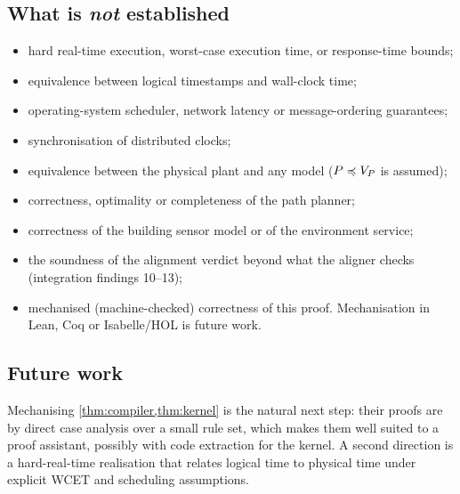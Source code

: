 \subsection{What is \emph{not} established}
\begin{itemize}
\item hard real-time execution, worst-case execution time, or response-time bounds;
\item equivalence between logical timestamps and wall-clock time;
\item operating-system scheduler, network latency or message-ordering guarantees;
\item synchronisation of distributed clocks;
\item equivalence between the physical plant and any model ($P\preccurlyeq V_P$ is assumed);
\item correctness, optimality or completeness of the path planner;
\item correctness of the building sensor model or of the environment service;
\item the soundness of the alignment verdict beyond what the aligner checks
  (integration findings 10--13);
\item mechanised (machine-checked) correctness of this proof. Mechanisation in
  Lean, Coq or Isabelle/HOL is future work.
\end{itemize}

\subsection{Future work}
Mechanising \cref{thm:compiler,thm:kernel} is the natural next step: their
proofs are by direct case analysis over a small rule set, which makes them
well suited to a proof assistant, possibly with code extraction for the
kernel. A second direction is a hard-real-time realisation that relates
logical time to physical time under explicit WCET and scheduling assumptions.

